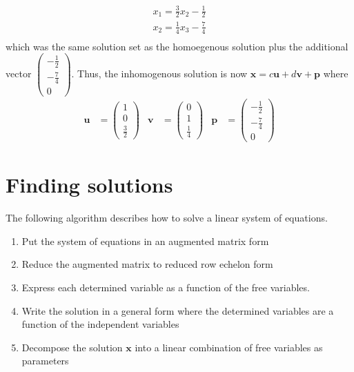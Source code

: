 \documentclass[
]{book}
\theoremstyle{definition}
\theoremstyle{definition}
\theoremstyle{definition}
\theoremstyle{definition}
\theoremstyle{remark}
\begin{document}
\[
\begin{aligned}
x_1 = \frac{3}{2} x_2  - \frac{1}{2}\\
x_2 = \frac{1}{4} x_3  - \frac{7}{4} \\
\end{aligned}
\]
which was the same solution set as the homoegenous solution plus the additional vector \(\begin{pmatrix} -\frac{1}{2} \\ -\frac{7}{4} \\ 0 \end{pmatrix}\). Thus, the inhomogenous solution is now \(\mathbf{x} = c \mathbf{u} + d \mathbf{v} + \mathbf{p}\) where
\[
\begin{aligned}
\mathbf{u} &= \begin{pmatrix} 1 \\ 0 \\ \frac{3}{2} \end{pmatrix} & 
\mathbf{v} &= \begin{pmatrix} 0 \\ 1 \\ \frac{1}{4} \end{pmatrix} & 
\mathbf{p} &= \begin{pmatrix} -\frac{1}{2} \\ -\frac{7}{4} \\ 0 \end{pmatrix} 
\end{aligned}
\]

\hypertarget{finding-solutions}{%
\section{Finding solutions}\label{finding-solutions}}

The following algorithm describes how to solve a linear system of equations.

\begin{enumerate}
\def\labelenumi{\arabic{enumi})}
\item
  Put the system of equations in an augmented matrix form
\item
  Reduce the augmented matrix to reduced row echelon form
\item
  Express each determined variable as a function of the free variables.
\item
  Write the solution in a general form where the determined variables are a function of the independent variables
\item
  Decompose the solution \(\mathbf{x}\) into a linear combination of free variables as parameters
\end{enumerate}
\end{document}
